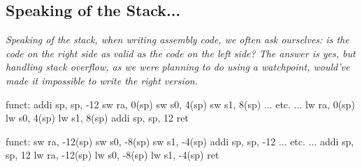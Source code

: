 \subsection{Speaking of the Stack...}
\textit{Speaking of the stack, when writing assembly code, we often ask ourselves: is the code on the right side as valid as the code on the left side? The answer is yes, but handling stack overflow, as we were planning to do using a watchpoint, would've made it impossible to write the right version.} \\
\begin{minipage}[htp]{0.45\textwidth}
\begin{assembly}
funct:
addi sp, sp, -12
sw   ra, 0(sp)
sw   s0, 4(sp)
sw   s1, 8(sp)
... etc. ...
lw   ra, 0(sp)
lw   s0, 4(sp)
lw   s1, 8(sp)
addi sp, sp, 12
ret
\end{assembly}    
\end{minipage}
\hfill
\vline
\hfill
\begin{minipage}[htp]{0.45\textwidth}
\begin{assembly}
funct:
sw   ra, -12(sp)
sw   s0, -8(sp)
sw   s1, -4(sp)
addi sp, sp, -12
... etc. ...
addi sp, sp, 12
lw   ra, -12(sp)
lw   s0, -8(sp)
lw   s1, -4(sp)
ret
\end{assembly}
\end{minipage}

